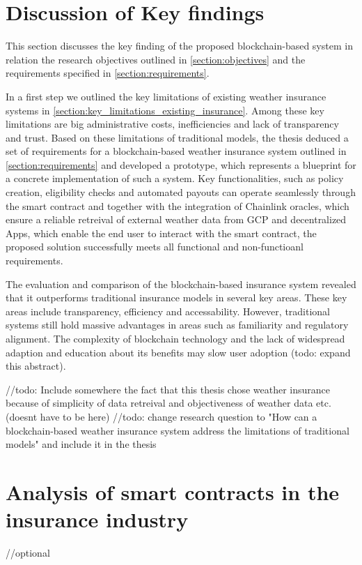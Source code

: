 \section{Discussion of Key findings}
This section discusses the key finding of the proposed blockchain-based system in relation the research objectives outlined in \cref{section:objectives} and the requirements specified in \cref{section:requirements}. 

In a first step we outlined the key limitations of existing weather insurance systems in \cref{section:key_limitations_existing_insurance}. Among these key limitations are big administrative costs, inefficiencies and lack of transparency and trust. Based on these limitations of traditional models, the thesis deduced a set of requirements for a blockchain-based weather insurance system outlined in \cref{section:requirements} and developed a prototype, which represents a blueprint for a concrete implementation of such a system. Key functionalities, such as policy creation, eligibility checks and automated payouts can operate seamlessly through the smart contract and together with the integration of Chainlink oracles, which ensure a reliable retreival of external weather data from GCP and decentralized Apps, which enable the end user to interact with the smart contract, the proposed solution successfully meets all functional and non-functioanl requirements.

The evaluation and comparison of the blockchain-based insurance system revealed that it outperforms traditional insurance models in several key areas. These key areas include transparency, efficiency and accessability. However, traditional systems still hold massive advantages in areas such as familiarity and regulatory alignment. The complexity of blockchain technology and the lack of widespread adaption and education about its benefits may slow user adoption (todo: expand this abstract).

//todo: Include somewhere the fact that this thesis chose weather insurance because of simplicity of data retreival and objectiveness of weather data etc. (doesnt have to be here)
//todo: change research question to "How can a blockchain-based weather insurance system address the limitations of traditional models" and include it in the thesis

\section{Analysis of smart contracts in the insurance industry}\label{section:analysis_smart_contracts_insurance}
//optional

